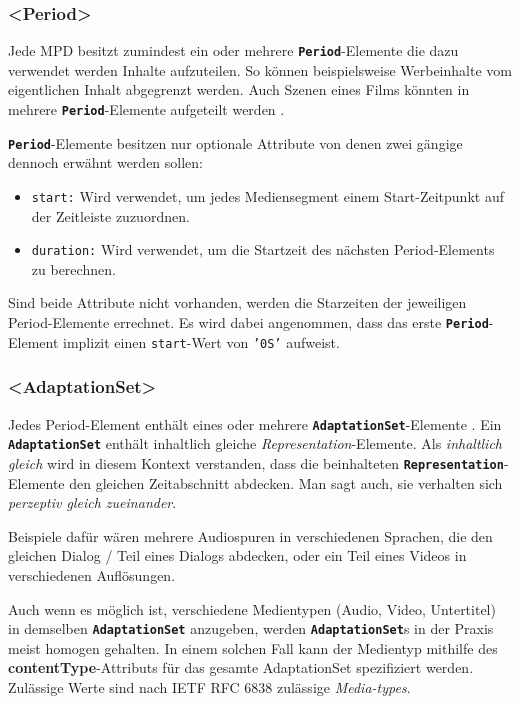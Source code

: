 \documentclass[paper = a4, fontsize = 12pt, parskip = half]{scrartcl} %
\def\attr#1{\texttt{#1}}
\def\elem#1{\texttt{\textbf{#1}}}
\begin{document}
\subsubsection{<Period>}
Jede MPD besitzt zumindest ein oder mehrere \elem{Period}-Elemente die dazu verwendet werden Inhalte aufzuteilen. So können beispielsweise Werbeinhalte vom eigentlichen Inhalt abgegrenzt werden. Auch Szenen eines Films könnten in mehrere \elem{Period}-Elemente aufgeteilt werden \cite{international_organization_for_standardization_isoiec_nodate}.

\elem{Period}-Elemente besitzen nur optionale Attribute von denen zwei gängige dennoch erwähnt werden sollen:
\begin{itemize}
	\item \attr{start:} Wird verwendet, um jedes Mediensegment einem Start-Zeitpunkt auf der Zeitleiste zuzuordnen.
	\item \attr{duration:} Wird verwendet, um die Startzeit des nächsten Period-Elements zu berechnen.
\end{itemize}

Sind beide Attribute nicht vorhanden, werden die Starzeiten der jeweiligen Period-Elemente errechnet. Es wird dabei angenommen, dass das erste \elem{Period}-Element implizit einen \attr{start}-Wert von \attr{'0S'} aufweist.

\subsubsection{<AdaptationSet>}
Jedes Period-Element enthält eines oder mehrere \elem{AdaptationSet}-Elemente \cite{international_organization_for_standardization_isoiec_nodate}. Ein \elem{AdaptationSet} enthält inhaltlich gleiche \textit{Representation}-Elemente. Als \textit{inhaltlich gleich} wird in diesem Kontext verstanden, dass die beinhalteten \elem{Representation}-Elemente den gleichen Zeitabschnitt abdecken. Man sagt auch, sie verhalten sich \textit{perzeptiv gleich zueinander}.

Beispiele dafür wären mehrere Audiospuren in verschiedenen Sprachen, die den gleichen Dialog / Teil eines Dialogs abdecken, oder ein Teil eines Videos in verschiedenen Auflösungen.

Auch wenn es möglich ist, verschiedene Medientypen (Audio, Video, Untertitel) in demselben \elem{AdaptationSet} anzugeben, werden \elem{AdaptationSet}s in der Praxis meist homogen gehalten. In einem solchen Fall kann der Medientyp mithilfe des \textbf{contentType}-Attributs für das gesamte AdaptationSet spezifiziert werden. Zulässige Werte sind nach IETF RFC 6838 zulässige \textit{Media-types}.
\end{document}
